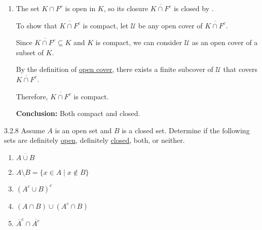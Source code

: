 {\begin{enumerate}
    \item The set \(K \cap F^c\) is open in \(K\), so its closure \(\overline{K \cap F^c}\) is closed by .

    To show that \(\overline{K \cap F^c}\) is compact, let \(\mathcal{U}\) be any open cover of \(\overline{K \cap F^c}\).

    Since \(\overline{K \cap F^c} \subseteq K\) and \(K\) is compact, we can consider \(\mathcal{U}\) as an open cover of a subset of \(K\).

    By the definition of \hyperref[def:3.3.3]{open cover}, there exists a finite subcover of \(\mathcal{U}\) that covers \(\overline{K \cap F^c}\).

    Therefore, \(\overline{K \cap F^c}\) is compact.

    \textbf{Conclusion:} Both compact and closed.

\end{enumerate}
}


\begin{exercise}
    {3.2.8} Assume \(A\) is an open set and \(B\) is a closed set. Determine if the following sets are definitely \hyperref[def:3.2.2]{open}, definitely \hyperref[def:3.2.5]{closed}, both, or neither.
    \begin{enumerate}
        \item \(\overline{A \cup B}\)
        \item \(A \setminus B = \{x \in A \mid x \notin B\}\)
        \item \((A^c \cup B)^c\)
        \item \((A \cap B) \cup (A^c \cap B)\)
        \item \(\overline{A}^c \cap \overline{A^c}\)
    \end{enumerate}
\end{exercise}

